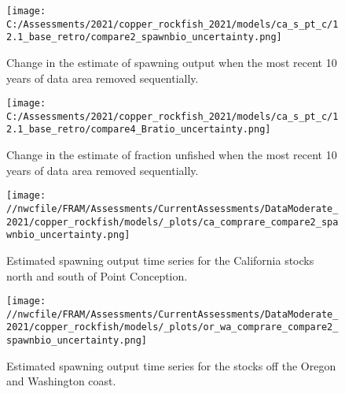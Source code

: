\documentclass[11pt,
  english,
  a4paper,
]{article}
\begin{document}
\begin{figure}
\centering
\texttt{[image: C:/Assessments/2021/copper\_rockfish\_2021/models/ca\_s\_pt\_c/12.1\_base\_retro/compare2\_spawnbio\_uncertainty.png]}
\caption{Change in the estimate of spawning output when the most recent 10 years of data area removed sequentially.\label{fig:retro-ssb}}
\end{figure}

\tagmcend\tagstructend


\begin{figure}
\centering
\texttt{[image: C:/Assessments/2021/copper\_rockfish\_2021/models/ca\_s\_pt\_c/12.1\_base\_retro/compare4\_Bratio\_uncertainty.png]}
\caption{Change in the estimate of fraction unfished when the most recent 10 years of data area removed sequentially.\label{fig:retro-depl}}
\end{figure}

\tagmcend\tagstructend

\newpage


\begin{figure}
\centering
\texttt{[image: //nwcfile/FRAM/Assessments/CurrentAssessments/DataModerate\_2021/copper\_rockfish/models/\_plots/ca\_comprare\_compare2\_spawnbio\_uncertainty.png]}
\caption{Estimated spawning output time series for the California stocks north and south of Point Conception.\label{fig:ssb-ca-compare}}
\end{figure}

\tagmcend\tagstructend


\begin{figure}
\centering
\texttt{[image: //nwcfile/FRAM/Assessments/CurrentAssessments/DataModerate\_2021/copper\_rockfish/models/\_plots/or\_wa\_comprare\_compare2\_spawnbio\_uncertainty.png]}
\caption{Estimated spawning output time series for the stocks off the Oregon and Washington coast.\label{fig:ssb-orwa-compare}}
\end{figure}
\end{document}
